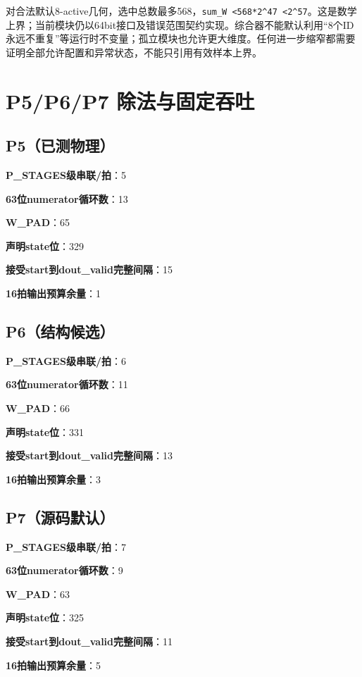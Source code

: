 \documentclass[UTF8,fontset=fandol,10pt,a4paper,openany]{ctexrep}
\newcommand{\code}[1]{\nolinkurl{#1}}
\begin{document}
对合法默认8-active几何，选中总数最多568，\code{sum_W <568*2^47 <2^57}。这是数学上界；当前模块仍以64bit接口及错误范围契约实现。综合器不能默认利用“8个ID永远不重复”等运行时不变量；孤立模块也允许更大维度。任何进一步缩窄都需要证明全部允许配置和异常状态，不能只引用有效样本上界。


\section{P5/P6/P7 除法与固定吞吐}


\subsection*{P5（已测物理）}
\noindent\textbf{P\_STAGES级串联/拍}：5\par
\noindent\textbf{63位numerator循环数}：13\par
\noindent\textbf{W\_PAD}：65\par
\noindent\textbf{声明state位}：329\par
\noindent\textbf{接受start到dout\_valid完整间隔}：15\par
\noindent\textbf{16拍输出预算余量}：1\par
\subsection*{P6（结构候选）}
\noindent\textbf{P\_STAGES级串联/拍}：6\par
\noindent\textbf{63位numerator循环数}：11\par
\noindent\textbf{W\_PAD}：66\par
\noindent\textbf{声明state位}：331\par
\noindent\textbf{接受start到dout\_valid完整间隔}：13\par
\noindent\textbf{16拍输出预算余量}：3\par
\subsection*{P7（源码默认）}
\noindent\textbf{P\_STAGES级串联/拍}：7\par
\noindent\textbf{63位numerator循环数}：9\par
\noindent\textbf{W\_PAD}：63\par
\noindent\textbf{声明state位}：325\par
\noindent\textbf{接受start到dout\_valid完整间隔}：11\par
\noindent\textbf{16拍输出预算余量}：5\par
\end{document}
